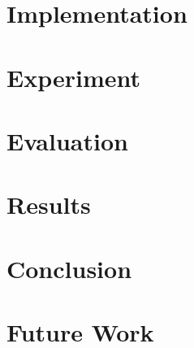 \documentclass[12pt]{article}
\begin{document}
\section{Implementation}
\section{Experiment}
\section{Evaluation}
\section{Results}
\section{Conclusion}
\section{Future Work}
\end{document}
